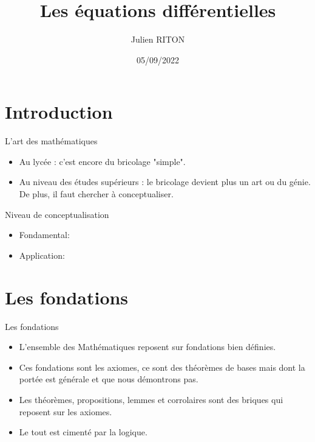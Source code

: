 \documentclass[11pt]{beamer}
\author{Julien RITON}
\title{Les équations différentielles}
\institute{UB - I.U.T. de Bourgogne site d'Auxerre}
\date{05/09/2022}
\begin{document}
\begin{frame}
\titlepage
\end{frame}

\begin{frame}
\tableofcontents
\end{frame}

\section{Introduction}
\begin{frame}{L'art des mathématiques}
\begin{itemize}
\item
Au lycée : c'est encore du bricolage "simple".
\item
Au niveau des études supérieurs : le bricolage devient plus un art ou du génie.
De plus, il faut chercher à conceptualiser.

\end{itemize}
\end{frame}

\begin{frame}{Niveau de conceptualisation}
\begin{itemize}

\item
Fondamental:
\item
Application:

\end{itemize}

\end{frame}


\section{Les fondations}
\begin{frame}{Les fondations}
\begin{itemize}
\item
L'ensemble des Mathématiques reposent sur fondations bien définies.
\item
Ces fondations sont les axiomes, ce sont des théorèmes de bases mais dont la portée est générale et que nous démontrons pas.
\item
Les théorèmes, propositions, lemmes et corrolaires sont des briques qui reposent sur les axiomes.
\item
Le tout est cimenté par la logique.


\end{itemize}
\end{frame}
\end{document}
